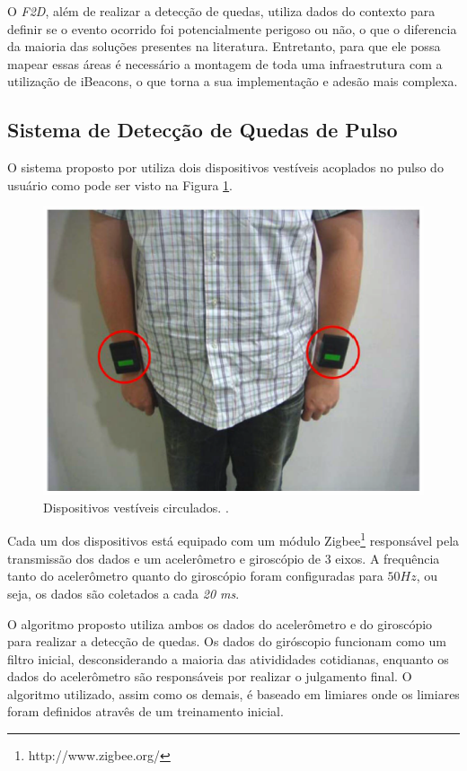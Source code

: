 O \textit{F2D}, além de realizar a detecção de quedas, utiliza dados do contexto para definir se o evento ocorrido foi potencialmente perigoso ou não, o que o diferencia da maioria das soluções presentes na literatura. Entretanto, para que ele possa mapear essas áreas é necessário a montagem de toda uma infraestrutura com a utilização de iBeacons, o que torna a sua implementação e adesão mais complexa.


\subsection{Sistema de Detecção de Quedas de Pulso}
\label{subsec:hsieh}
O sistema proposto por \cite{hsieh2014wrist} utiliza dois dispositivos vestíveis acoplados no pulso do usuário como pode ser visto na Figura \ref{fig:wrist_worn}. 


\begin{figure}[ht]
	\centering
	\includegraphics[scale=0.4]{imagens/wrist_worn.png}
	\caption{ Dispositivos vestíveis circulados. \citep{hsieh2014wrist}.}
	\label{fig:wrist_worn}
\end{figure} 


Cada um dos dispositivos está equipado com um módulo Zigbee\footnote{http://www.zigbee.org/} responsável pela transmissão dos dados e  um acelerômetro e  giroscópio de 3 eixos. A frequência tanto do acelerômetro quanto do giroscópio foram configuradas para $50 Hz$, ou seja, os dados são coletados a cada \textit{20 ms}.


O algoritmo proposto utiliza ambos os dados do acelerômetro e do giroscópio para realizar a detecção de quedas. Os dados do giróscopio funcionam como um filtro inicial, desconsiderando a maioria das ativididades cotidianas, enquanto os dados do acelerômetro são responsáveis por realizar o julgamento final. O algoritmo utilizado, assim como os demais, é baseado em limiares onde os limiares foram definidos atravês de um treinamento inicial. 

